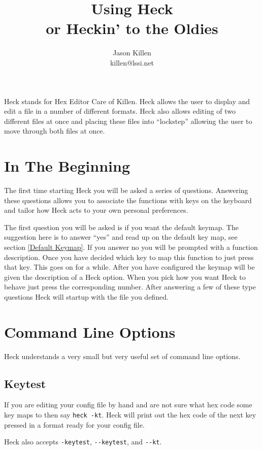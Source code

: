 \documentclass[12pt]{article}
\title{Using Heck\\or Heckin' to the Oldies}
\author{Jason Killen\\killen@lssi.net}
\begin{document}
\maketitle

Heck stands for Hex Editor Care of Killen.  Heck allows the user to display 
and edit a file in a number of different formats.  Heck also allows editing of 
two different files at once and placing these files into ``lockstep'' allowing 
the user to move through both files at once.

\section{In The Beginning}
The first time starting Heck you will be asked a series of questions.  
Answering these questions allows you to associate the functions with keys
on the keyboard and tailor how Heck acts to your own personal preferences.

The first question you will be asked is if you want the default keymap.  The
suggestion here is to answer ``yes'' and read up on the default key map, see 
section \ref{Default Keymap}.  If you answer no you will be
prompted with a function description.  Once you have decided which key to
map this function to just press that key.  This goes on for a while.  After 
you have configured the keymap will be given the description
of a Heck option.  When you pick how you want Heck to behave just press the
corresponding number.  After answering a few of these type questions Heck will
startup with the file you defined.

\section{Command Line Options}
Heck understands a very small but very useful set of command line options.

\subsection{Keytest}
\label{Keytest}
If you are editing your config file by hand and are not sure what hex code 
some key maps to then say \verb#heck -kt#.  Heck will print out the hex code
of the next key pressed in a format ready for your config file.

Heck also accepts \verb#-keytest#, \verb#--keytest#, and \verb#--kt#.
\end{document}
